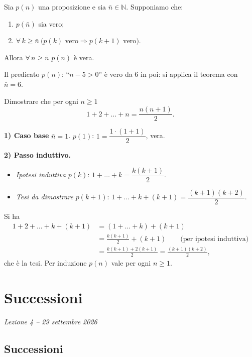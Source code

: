 \documentclass[11pt,a4paper]{article}
\begin{document}
\begin{teorema}
Sia $p(n)$ una proposizione e sia $\bar n \in \mathbb{N}$. Supponiamo che:
\begin{enumerate}
    \item $p(\bar n)$ sia vero;
    \item $\forall\, k \geq \bar n \ \big(p(k) \text{ vero} \Rightarrow
          p(k+1) \text{ vero}\big)$.
\end{enumerate}
Allora $\forall\, n \geq \bar n$ $p(n)$ è vera.
\end{teorema}

\begin{esempio}
Il predicato $p(n)$: ``$n - 5 > 0$'' è vero da $6$ in poi: si applica il
teorema con $\bar n = 6$.
\end{esempio}

\begin{esempio}
Dimostrare che per ogni $n \geq 1$
\[
1 + 2 + \dots + n = \frac{n(n+1)}{2}. \tag*{$p(n)$}
\]

\textbf{1) Caso base} $\bar n = 1$. $p(1)$: $1 = \dfrac{1 \cdot (1+1)}{2}$,
vera.

\textbf{2) Passo induttivo.}
\begin{itemize}
    \item \emph{Ipotesi induttiva} $p(k)$:
          $1 + \dots + k = \dfrac{k(k+1)}{2}$.
    \item \emph{Tesi da dimostrare} $p(k+1)$:
          $1 + \dots + k + (k+1) = \dfrac{(k+1)(k+2)}{2}$.
\end{itemize}
Si ha
\begin{align*}
1 + 2 + \dots + k + (k+1) &= (1 + \dots + k) + (k+1)\\
&= \frac{k(k+1)}{2} + (k+1) \qquad \text{(per ipotesi induttiva)}\\
&= \frac{k(k+1) + 2(k+1)}{2} = \frac{(k+1)(k+2)}{2},
\end{align*}
che è la tesi. Per induzione $p(n)$ vale per ogni $n \geq 1$.
\end{esempio}

\section[Successioni (Lezione 4 -- 29 settembre 2026)]{Successioni}
\noindent\emph{Lezione 4 -- 29 settembre 2026}
\subsection{Successioni}
\end{document}
